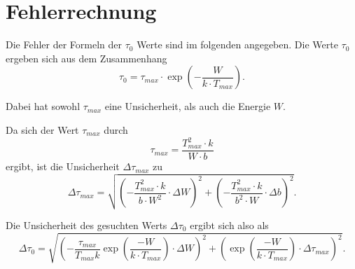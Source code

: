 \section{Fehlerrechnung}
\label{sec:fehler}


Die Fehler der Formeln der $\tau_0$ Werte sind im folgenden angegeben.
Die Werte $\tau_0$ ergeben sich aus dem Zusammenhang
\begin{equation*}
\tau_0 = \tau_{max} \cdot \exp(-\frac{W}{k \cdot T_{max}}).
\end{equation*}

Dabei hat sowohl $\tau_{max}$ eine Unsicherheit, als auch die Energie $W$. 

Da sich der Wert $\tau_{max}$ durch
\begin{equation*}
    \tau_{max} = \frac{T_{max}^2 \cdot k}{W \cdot b}
\end{equation*}
ergibt, ist die Unsicherheit $\Delta \tau_{max}$ zu 
\begin{equation*}
    \Delta \tau_{max} = \sqrt{\left(- \frac{T_{max}^2 \cdot k}{b \cdot W^2} \cdot \Delta W \right)^2 + \left(- \frac{T_{max}^2 \cdot k}{b^2 \cdot W}  \cdot \Delta b \right)^2}.
\end{equation*}

Die Unsicherheit des gesuchten Werts $\Delta \tau_0$ ergibt sich also als 
 \begin{equation*}
     \Delta \tau_0 = \sqrt{\left(- \frac{\tau_{max}}{ T_{max} k} \exp(\frac{-W}{k\cdot T_{max}}) \cdot \Delta W \right)^2 + \left(\exp(\frac{-W}{k\cdot T_{max}}) \cdot \Delta \tau_{max} \right)^2}.
 \end{equation*}